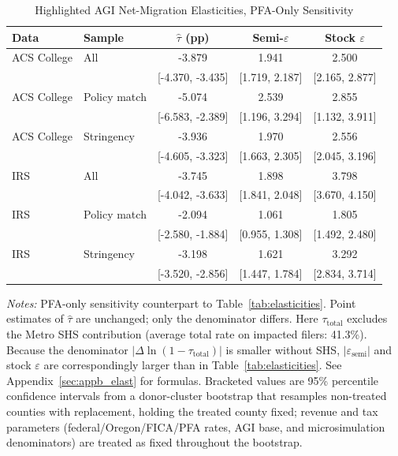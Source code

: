 \begin{table}[htbp]
\centering
\begin{threeparttable}
\caption{Highlighted AGI Net-Migration Elasticities, PFA-Only Sensitivity}
\label{tab:elasticities_pfa_only}
\begin{tabular}{ll ccc}
\toprule
Data & Sample & $\hat{\tau}$ (pp) & Semi-$\varepsilon$ & Stock $\varepsilon$ \\
\midrule
ACS College & All & -3.879 & 1.941 & 2.500 \\
 & & [-4.370, -3.435] & [1.719, 2.187] & [2.165, 2.877] \\
ACS College & Policy match & -5.074 & 2.539 & 2.855 \\
 & & [-6.583, -2.389] & [1.196, 3.294] & [1.132, 3.911] \\
ACS College & Stringency & -3.936 & 1.970 & 2.556 \\
 & & [-4.605, -3.323] & [1.663, 2.305] & [2.045, 3.196] \\
\addlinespace
IRS & All & -3.745 & 1.898 & 3.798 \\
 & & [-4.042, -3.633] & [1.841, 2.048] & [3.670, 4.150] \\
IRS & Policy match & -2.094 & 1.061 & 1.805 \\
 & & [-2.580, -1.884] & [0.955, 1.308] & [1.492, 2.480] \\
IRS & Stringency & -3.198 & 1.621 & 3.292 \\
 & & [-3.520, -2.856] & [1.447, 1.784] & [2.834, 3.714] \\
\bottomrule
\end{tabular}
\begin{tablenotes}
\small
\item \textit{Notes:} 
PFA-only sensitivity counterpart to Table~\ref{tab:elasticities}. 
Point estimates of $\hat{\tau}$ are unchanged; only the denominator differs. 
Here $\tau_\text{total}$ excludes the Metro SHS contribution (average total rate on impacted filers: 41.3\%). 
Because the denominator $|\Delta\ln(1-\tau_\text{total})|$ is smaller without SHS, $|\varepsilon_{\text{semi}}|$ and stock $\varepsilon$ are correspondingly larger than in Table~\ref{tab:elasticities}. 
See Appendix~\ref{sec:appb_elast} for formulas. 
Bracketed values are 95\% percentile confidence intervals from a 
donor-cluster bootstrap that resamples non-treated counties with replacement, 
holding the treated county fixed; revenue and tax parameters 
(federal/Oregon/FICA/PFA rates, AGI base, and microsimulation denominators) 
are treated as fixed throughout the bootstrap.
\end{tablenotes}
\end{threeparttable}
\end{table}
